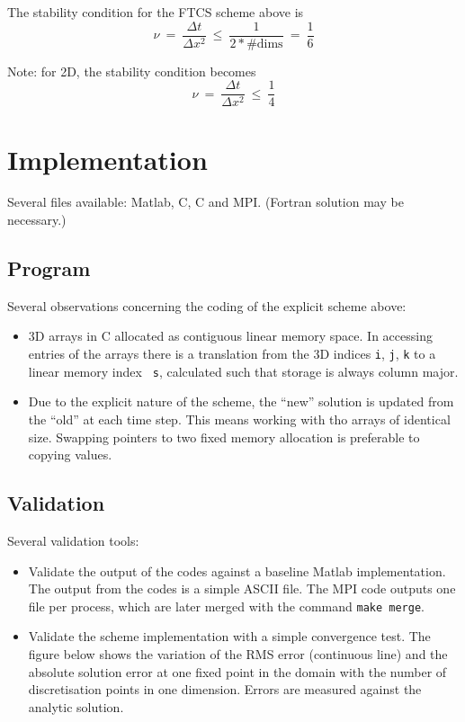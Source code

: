 \documentclass[12pt]{article}
\def \fr {\frac}
\begin{document}
The stability condition for the FTCS scheme above is
\[
  \nu \ =\ \fr{\Delta t}{\Delta x^2} \ \leq\ \fr{1}{2*\text{\# dims}}\ =\ \fr{1}{6}
\]

Note: for 2D, the stability condition becomes
\[
  \nu \ =\ \fr{\Delta t}{\Delta x^2} \ \leq\ \fr{1}{4}
\]

\section{Implementation}

Several files available: Matlab, C, C and MPI.  (Fortran solution may be necessary.)

\subsection{Program}
Several observations concerning the coding of the explicit scheme above:
%
\begin{itemize}
  \item 3D arrays in C allocated as contiguous linear memory space.
    In accessing entries of the arrays there is a translation from the
    3D indices {\tt i}, {\tt j}, {\tt k} to a linear memory index {\tt
      s}, calculated such that storage is always column major.
  \item Due to the explicit nature of the scheme, the ``new'' solution
    is updated from the ``old'' at each time step.  This means working
    with tho arrays of identical size.  Swapping pointers to two fixed
    memory allocation is preferable to copying values.
\end{itemize}

\subsection{Validation}
Several validation tools:
%
\begin{itemize}
  \item Validate the output of the codes against a baseline Matlab
    implementation.  The output from the codes is a simple ASCII file.
    The MPI code outputs one file per process, which are later merged
    with the command {\tt make merge}.
  \item Validate the scheme implementation with a simple convergence
    test.  The figure below shows the variation of the RMS error
    (continuous line) and the absolute solution error at one fixed
    point in the domain with the number of discretisation points in
    one dimension.  Errors are measured against the analytic solution.
    \begin{figure}
      \centering
    \end{figure}

\end{itemize}
\end{document}
